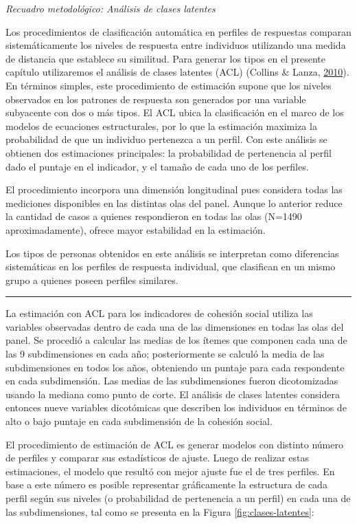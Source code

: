 \documentclass[
  12pt,
]{book}
\begin{document}
\emph{Recuadro metodológico: Análisis de clases latentes}

Los procedimientos de clasificación automática en perfiles de respuestas comparan sistemáticamente los niveles de respuesta entre individuos utilizando una medida de distancia que establece su similitud. Para generar los tipos en el presente capítulo utilizaremos el análisis de clases latentes (ACL) (Collins \& Lanza, \protect\hyperlink{ref-collins_latent_2010}{2010}). En términos simples, este procedimiento de estimación supone que los niveles observados en los patrones de respuesta son generados por una variable subyacente con dos o más tipos. El ACL ubica la clasificación en el marco de los modelos de ecuaciones estructurales, por lo que la estimación maximiza la probabilidad de que un individuo pertenezca a un perfil. Con este análisis se obtienen dos estimaciones principales: la probabilidad de pertenencia al perfil dado el puntaje en el indicador, y el tamaño de cada uno de los perfiles.

El procedimiento incorpora una dimensión longitudinal pues considera todas las mediciones disponibles en las distintas olas del panel. Aunque lo anterior reduce la cantidad de casos a quienes respondieron en todas las olas (N=1490 aproximadamente), ofrece mayor estabilidad en la estimación.

Los tipos de personas obtenidos en este análisis se interpretan como diferencias sistemáticas en los perfiles de respuesta individual, que clasifican en un mismo grupo a quienes poseen perfiles similares.

\begin{center}\rule{0.5\linewidth}{0.5pt}\end{center}

La estimación con ACL para los indicadores de cohesión social utiliza las variables observadas dentro de cada una de las dimensiones en todas las olas del panel. Se procedió a calcular las medias de los ítemes que componen cada una de las 9 subdimensiones en cada año; posteriormente se calculó la media de las subdimensiones en todos los años, obteniendo un puntaje para cada respondente en cada subdimensión. Las medias de las subdimensiones fueron dicotomizadas usando la mediana como punto de corte. El análisis de clases latentes considera entonces nueve variables dicotómicas que describen los individuos en términos de alto o bajo puntaje en cada subdimensión de la cohesión social.

El procedimiento de estimación de ACL es generar modelos con distinto número de perfiles y comparar sus estadísticos de ajuste. Luego de realizar estas estimaciones, el modelo que resultó con mejor ajuste fue el de tres perfiles. En base a este número es posible representar gráficamente la estructura de cada perfil según sus niveles (o probabilidad de pertenencia a un perfil) en cada una de las subdimensiones, tal como se presenta en la Figura \ref{fig:clases-latentes}:
\end{document}
